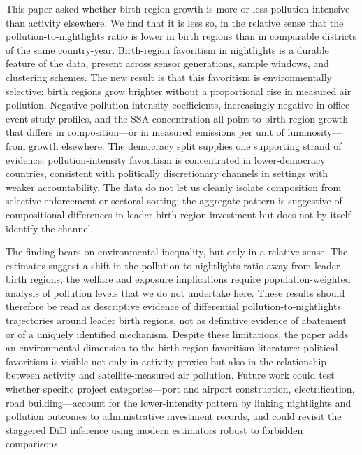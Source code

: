 \documentclass[9pt,twocolumn,twoside]{pnas-new}
\begin{document}
This paper asked whether birth-region growth is more or less pollution-intensive than activity elsewhere. We find that it is less so, in the relative sense that the pollution-to-nightlights ratio is lower in birth regions than in comparable districts of the same country-year. Birth-region favoritism in nightlights is a durable feature of the data, present across sensor generations, sample windows, and clustering schemes. The new result is that this favoritism is environmentally selective: birth regions grow brighter without a proportional rise in measured air pollution. Negative pollution-intensity coefficients, increasingly negative in-office event-study profiles, and the SSA concentration all point to birth-region growth that differs in composition---or in measured emissions per unit of luminosity---from growth elsewhere. The democracy split supplies one supporting strand of evidence: pollution-intensity favoritism is concentrated in lower-democracy countries, consistent with politically discretionary channels in settings with weaker accountability. The data do not let us cleanly isolate composition from selective enforcement or sectoral sorting; the aggregate pattern is suggestive of compositional differences in leader birth-region investment but does not by itself identify the channel.

The finding bears on environmental inequality, but only in a relative sense. The estimates suggest a shift in the pollution-to-nightlights ratio away from leader birth regions; the welfare and exposure implications require population-weighted analysis of pollution levels that we do not undertake here. These results should therefore be read as descriptive evidence of differential pollution-to-nightlights trajectories around leader birth regions, not as definitive evidence of abatement or of a uniquely identified mechanism. Despite these limitations, the paper adds an environmental dimension to the birth-region favoritism literature: political favoritism is visible not only in activity proxies but also in the relationship between activity and satellite-measured air pollution. Future work could test whether specific project categories---port and airport construction, electrification, road building---account for the lower-intensity pattern by linking nightlights and pollution outcomes to administrative investment records, and could revisit the staggered DiD inference using modern estimators robust to forbidden comparisons.

\end{document}
